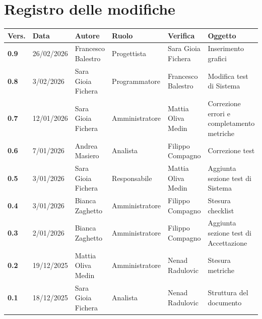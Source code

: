 \documentclass[a4paper,12pt]{article}
\begin{document}
    

    \section*{Registro delle modifiche} {
        \begin{table}[h!]
                \begin{tabularx}{\textwidth}{|l|l|l|l|L|L|}
                \hline
                \textbf{Vers.} & \textbf{Data} & \textbf{Autore} & \textbf{Ruolo} & \textbf{Verifica} & \textbf{Oggetto} \\
                \hline
                \textbf{0.9} & 26/02/2026 & Francesco Balestro & Progettista & Sara Gioia Fichera & Inserimento grafici\\
                \hline
                \textbf{0.8} & 3/02/2026 & Sara Gioia Fichera & Programmatore & Francesco Balestro & Modifica test di Sistema\\
                \hline
                \textbf{0.7} & 12/01/2026 & Sara Gioia Fichera & Amministratore & Mattia Oliva Medin & Correzione errori e completamento metriche \\
                \hline
                \textbf{0.6} & 7/01/2026 & Andrea Masiero & Analista & Filippo Compagno & Correzione test \\
                \hline
                \textbf{0.5} & 3/01/2026 & Sara Gioia Fichera & Responsabile & Mattia Oliva Medin & Aggiunta sezione test di Sistema \\
                \hline
                \textbf{0.4} & 3/01/2026 & Bianca Zaghetto & Amministratore & Filippo Compagno & Stesura checklist \\
                \hline
                \textbf{0.3} & 2/01/2026 & Bianca Zaghetto & Amministratore & Filippo Compagno & Aggiunta sezione test di Accettazione \\
                \hline
                \textbf{0.2} & 19/12/2025 & Mattia Oliva Medin & Amministratore & Nenad Radulovic & Stesura metriche\\
                \hline
                \textbf{0.1} & 18/12/2025 & Sara Gioia Fichera & Analista & Nenad Radulovic & Struttura del documento \\
                \hline
            \end{tabularx}
        \end{table}
    }
    \newpage
    
    \tableofcontents
    \newpage
\end{document}
